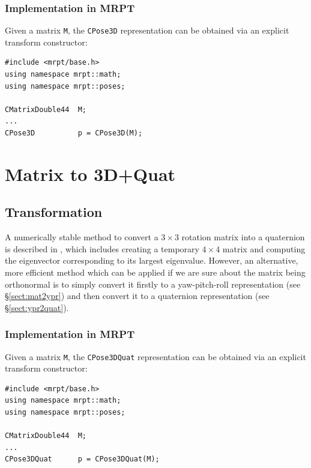 \documentclass[a4paper,10pt]{report}
\begin{document}
\subsubsection{Implementation in MRPT}

Given a matrix \texttt{M}, the \texttt{CPose3D} representation can be obtained via
an explicit transform constructor:

\begin{lstlisting}
#include <mrpt/base.h> 
using namespace mrpt::math; 
using namespace mrpt::poses; 

CMatrixDouble44  M;
...
CPose3D          p = CPose3D(M);
\end{lstlisting}


\section{Matrix to 3D+Quat }

\subsection{Transformation}

A numerically stable method to convert a $3 \times 3$ rotation matrix into a quaternion is
described in \cite{bar2000new}, which includes creating a temporary $4 \times 4$ matrix and 
computing the eigenvector corresponding to its largest eigenvalue. 
However, an alternative, more efficient method which can be applied if we are sure about 
the matrix being orthonormal is to simply convert it firstly to a yaw-pitch-roll representation 
(see \S \ref{sect:mat2ypr}) and then convert it 
to a quaternion representation (see \S \ref{sect:ypr2quat}).

 
\subsubsection{Implementation in MRPT}

Given a matrix \texttt{M}, the \texttt{CPose3DQuat} representation can be obtained via
an explicit transform constructor:

\begin{lstlisting}
#include <mrpt/base.h> 
using namespace mrpt::math; 
using namespace mrpt::poses; 

CMatrixDouble44  M;
...
CPose3DQuat      p = CPose3DQuat(M);
\end{lstlisting}
\end{document}
